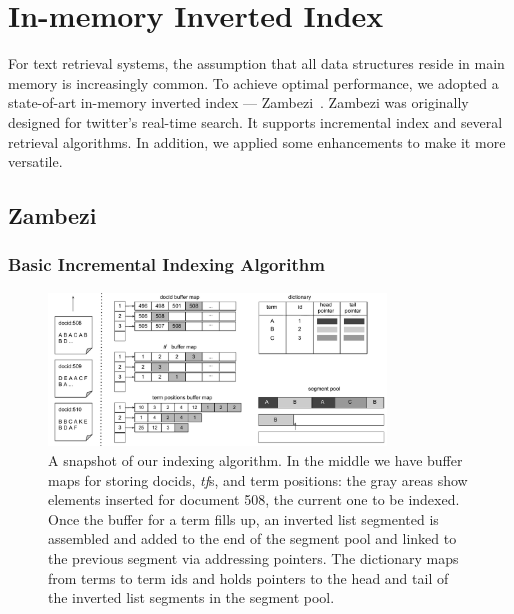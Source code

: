 \chapter{In-memory Inverted Index}
For text retrieval systems, the assumption that all data structures reside in main memory is increasingly common. To achieve optimal performance, we adopted a state-of-art in-memory inverted index --- Zambezi~\cite{Asadi_Lin_IRJ2012,Asadi_Lin_TOIS2013,Asadi_etal_TKDE2013,Asadi_Lin_SIGIR2013}. Zambezi was originally designed for twitter's real-time search. It supports incremental index and several retrieval algorithms. In addition, we applied some enhancements to make it more versatile.

\section{Zambezi}

\subsection{Basic Incremental Indexing Algorithm}
\label{section:algo:basic}

\begin{figure}[t]
  \begin{center}
    \includegraphics[width=0.8\textwidth]{Figures/IndexStructure.pdf}
  \end{center}
  \caption{A snapshot of our indexing algorithm. In the middle we have buffer maps for storing docids, \textit{tf}s, and term positions: the gray areas show elements inserted for document 508, the current one to be indexed. Once the buffer for a term fills up, an inverted list segmented is assembled and added to the end of the segment pool and linked to the previous segment via addressing pointers. The dictionary maps from terms to term ids and holds pointers to the head and tail of the inverted list segments in the segment pool.
  \label{figure:indexStructure}}
\end{figure}

